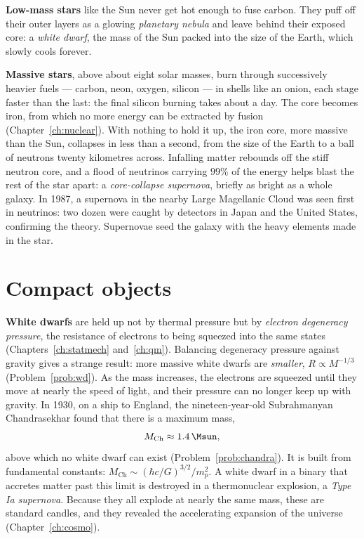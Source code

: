 \textbf{Low-mass stars} like the Sun never get hot enough to fuse carbon. They puff off their outer layers as a glowing \emph{planetary nebula} and leave behind their exposed core: a \emph{white dwarf}, the mass of the Sun packed into the size of the Earth, which slowly cools forever.

\textbf{Massive stars}, above about eight solar masses, burn through successively heavier fuels --- carbon, neon, oxygen, silicon --- in shells like an onion, each stage faster than the last: the final silicon burning takes about a day. The core becomes iron, from which no more energy can be extracted by fusion (Chapter~\ref{ch:nuclear}). With nothing to hold it up, the iron core, more massive than the Sun, collapses in less than a second, from the size of the Earth to a ball of neutrons twenty kilometres across. Infalling matter rebounds off the stiff neutron core, and a flood of neutrinos carrying $99\%$ of the energy helps blast the rest of the star apart: a \emph{core-collapse supernova}, briefly as bright as a whole galaxy. In 1987, a supernova in the nearby Large Magellanic Cloud was seen first in neutrinos: two dozen were caught by detectors in Japan and the United States, confirming the theory. Supernovae seed the galaxy with the heavy elements made in the star.

\section{Compact objects}

\textbf{White dwarfs} are held up not by thermal pressure but by \emph{electron degeneracy pressure}, the resistance of electrons to being squeezed into the same states (Chapters~\ref{ch:statmech} and~\ref{ch:qm}). Balancing degeneracy pressure against gravity gives a strange result: more massive white dwarfs are \emph{smaller}, $R\propto M^{-1/3}$ (Problem~\ref{prob:wd}). As the mass increases, the electrons are squeezed until they move at nearly the speed of light, and their pressure can no longer keep up with gravity. In 1930, on a ship to England, the nineteen-year-old Subrahmanyan Chandrasekhar found that there is a maximum mass,
\[
  M_{\text{Ch}}\approx1.4\,\Msun,
\]
above which no white dwarf can exist (Problem~\ref{prob:chandra}). It is built from fundamental constants: $M_{\text{Ch}}\sim(\hbar c/G)^{3/2}/m_p^2$. A white dwarf in a binary that accretes matter past this limit is destroyed in a thermonuclear explosion, a \emph{Type Ia supernova}. Because they all explode at nearly the same mass, these are standard candles, and they revealed the accelerating expansion of the universe (Chapter~\ref{ch:cosmo}).

